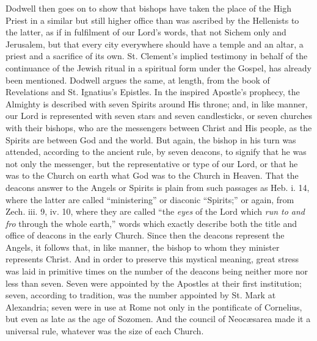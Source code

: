 Dodwell then goes on to show that bishops have
taken the place of the High Priest in a similar but still higher
office than was ascribed by the Hellenists to the latter, as if in
fulfilment of our Lord's words, that not Sichem only and Jerusalem,
but that every city everywhere should have a temple and an altar, a
priest and a sacrifice of its own. St. Clement's implied testimony in
behalf of the continuance of the Jewish ritual in a spiritual form
under the Gospel, has already been mentioned. Dodwell argues the same,
at length, from the book of Revelations and St. Ignatius's Epistles.
In the inspired Apostle's prophecy, the Almighty is described with
seven Spirits around His throne; and, in like manner, our Lord is
represented with seven stars and seven candlesticks, or seven churches
with their bishops, who are the messengers between Christ and His
people, as the Spirits are between God and the world. But again, the
bishop in his turn was attended, according to the ancient rule, by
seven deacons, to signify that he was not only the messenger, but the
representative or type of our Lord, or that he was to the Church on
earth what God was to the Church in Heaven. That the deacons answer to
the Angels or Spirits is plain from such passages as Heb. i. 14, where
the latter are called ``ministering'' or diaconic ``Spirits;'' or again,
from Zech. iii. 9, iv. 10, where they are called ``the \emph{eyes} of
the Lord which \emph{run to and fro} through the whole earth,'' words
which exactly describe both the title and office of deacons in the
early Church. Since then the deacons represent the Angels, it follows
that, in like manner, the bishop to whom they minister represents
Christ. And in order to preserve this mystical meaning, great stress
was laid in primitive times on the number of the deacons being neither
more nor less than seven. Seven were appointed by the Apostles at
their first institution; seven, according to tradition, was the number
appointed by St. Mark at Alexandria; seven were in use at Rome not
only in the pontificate of Cornelius, but even as late as the age of
Sozomen. And the council of Neocæsarea made it a universal rule,
whatever was the size of each Church.

